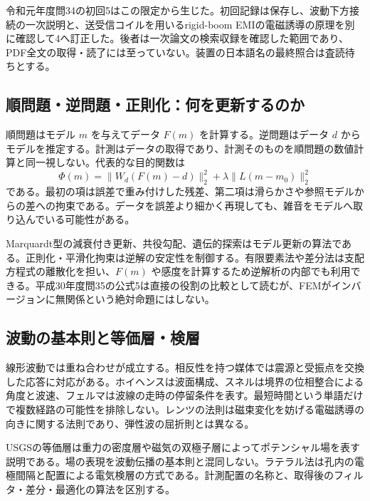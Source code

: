令和元年度問34の初回5はこの限定から生じた。初回記録は保存し、波動下方接続の一次説明と、送受信コイルを用いるrigid-boom EMIの電磁誘導の原理を別に確認して4へ訂正した\cite{rigid_boom2019}。後者は一次論文の検索収録を確認した範囲であり、PDF全文の取得・読了には至っていない。装置の日本語名の最終照合は査読待ちとする。

\subsection{順問題・逆問題・正則化：何を更新するのか}
\label{theory:exploration:inverse}
順問題はモデル \(m\) を与えてデータ \(F(m)\) を計算する。逆問題はデータ \(d\) からモデルを推定する。計測はデータの取得であり、計測そのものを順問題の数値計算と同一視しない。代表的な目的関数は
\[
 \Phi(m)=\|W_d(F(m)-d)\|_2^2+\lambda\|L(m-m_0)\|_2^2
\]
である。最初の項は誤差で重み付けした残差、第二項は滑らかさや参照モデルからの差への拘束である\cite{pygimli_inversion}。データを誤差より細かく再現しても、雑音をモデルへ取り込んでいる可能性がある。

Marquardt型の減衰付き更新、共役勾配、遺伝的探索はモデル更新の算法である。正則化・平滑化拘束は逆解の安定性を制御する。有限要素法や差分法は支配方程式の離散化を担い、\(F(m)\) や感度を計算するため逆解析の内部でも利用できる。平成30年度問35の公式5は直接の役割の比較として読むが、FEMがインバージョンに無関係という絶対命題にはしない。

\subsection{波動の基本則と等価層・検層}
\label{theory:exploration:principles}
線形波動では重ね合わせが成立する。相反性を持つ媒体では震源と受振点を交換した応答に対応がある。ホイヘンスは波面構成、スネルは境界の位相整合による角度と波速、フェルマは波線の走時の停留条件を表す。最短時間という単語だけで複数経路の可能性を排除しない。レンツの法則は磁束変化を妨げる電磁誘導の向きに関する法則であり、弾性波の屈折則とは異なる。

USGSの等価層は重力の密度層や磁気の双極子層によってポテンシャル場を表す説明である\cite{usgs_equivalent2007}。場の表現を波動伝播の基本則と混同しない。ラテラル法は孔内の電極間隔と配置による電気検層の方式である\cite{usgs_lateral_logging}。計測配置の名称と、取得後のフィルタ・差分・最適化の算法を区別する。
